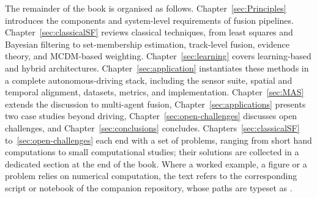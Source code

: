 The remainder of the book is organised as follows. Chapter~\ref{sec:Principles} introduces the components and system-level requirements of fusion pipelines. Chapter~\ref{sec:classicalSF} reviews classical techniques, from least squares and Bayesian filtering to set-membership estimation, track-level fusion, evidence theory, and MCDM-based weighting. Chapter~\ref{sec:learning} covers learning-based and hybrid architectures. Chapter~\ref{sec:application} instantiates these methods in a complete autonomous-driving stack, including the sensor suite, spatial and temporal alignment, datasets, metrics, and implementation. Chapter~\ref{sec:MAS} extends the discussion to multi-agent fusion, Chapter~\ref{sec:applications} presents two case studies beyond driving, Chapter~\ref{sec:open-challenges} discusses open challenges, and Chapter~\ref{sec:conclusions} concludes.
Chapters~\ref{sec:classicalSF} to~\ref{sec:open-challenges} each end with a set of problems, ranging from short hand computations to small computational studies; their solutions are collected in a dedicated section at the end of the book. Where a worked example, a figure or a problem relies on numerical computation, the text refers to the corresponding script or notebook of the companion repository, whose paths are typeset as .

%
%
